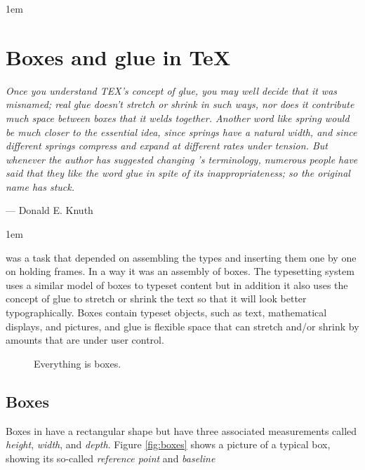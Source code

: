 \parindent1em

\chapter{Boxes and glue in TeX}

\setlength{\columnsep}{2em}
{\it Once you understand TEX's concept of glue, you may well decide that
it was misnamed; real glue doesn't stretch or shrink in such ways, nor does it
contribute much space between boxes that it welds together. Another word like
\emph{spring} would be much closer to the essential idea, since springs have a natural
width, and since different springs compress and expand at different rates
under tension. But whenever the author has suggested changing \tex's terminology,
numerous people have said that they like the word \emph{glue} in spite of its
inappropriateness; so the original name has stuck. }
\smallskip

{\hfill  ---  Donald E. Knuth}

\medskip   


\parindent1em




 was a task that depended on assembling the types and inserting them one by one on holding frames. In a way it was an assembly of boxes.
The \tex typesetting system uses a similar model of boxes to typeset content but in addition it also uses the concept of glue to stretch or shrink the text so that it will look better typographically. Boxes contain
typeset objects, such as text, mathematical displays, and pictures, and glue
is flexible space that can stretch and/or shrink by amounts that are under
user control.

\begin{figure}[h]
\centering
\hbox{}
\caption{Everything is boxes.}
\end{figure}

\printfontparams

\section*{Boxes}

Boxes in \tex have  a rectangular shape but have
three associated measurements called \emph{height}, \emph{width}, and \emph{depth}.
Figure \ref{fig:boxes} shows a 
picture of a typical box, showing its so-called \emph{reference point} and \emph{baseline}

